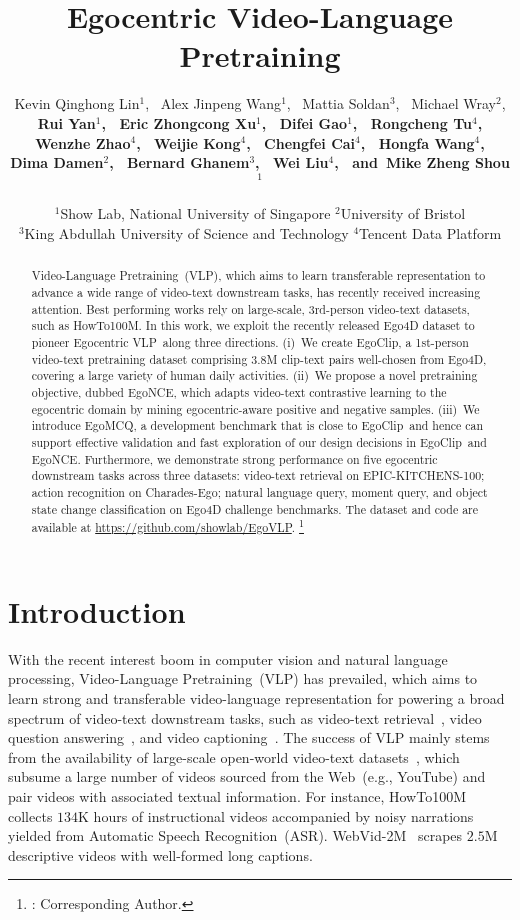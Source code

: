 \documentclass{article}
\title{Egocentric Video-Language Pretraining}
\author{Kevin Qinghong Lin$^1$,~
	Alex Jinpeng Wang$^1$,~
	Mattia Soldan$^3$,~
	Michael Wray$^2$,\\
\textbf{
	Rui Yan$^1$,~
	Eric Zhongcong Xu$^1$,~
	Difei Gao$^1$,~
	Rongcheng Tu$^4$,}\\
\textbf{
	Wenzhe Zhao$^4$,~
	Weijie Kong$^4$,~
	Chengfei Cai$^4$,~
	Hongfa Wang$^4$,}\\
\textbf{
    Dima Damen$^2$,~
	Bernard Ghanem$^3$,~
	Wei Liu$^4$,~
	and~Mike Zheng Shou$^1$\textsuperscript{\Letter}}
	\\\\
	$^1$Show Lab, National University of Singapore\quad
	$^2$University of Bristol\\
	$^3$King Abdullah University of Science and Technology\quad 
	$^4$Tencent Data Platform
}
\newcommand{\vlp}{Egocentric VLP}
\newcommand{\dataset}{EgoClip}
\newcommand{\model}{EgoNCE\xspace}
\newcommand{\eval}{EgoMCQ}
\newcommand{\epic}{EPIC-KITCHENS-100}
\newcommand{\web}{WebVid-2M}
\newcommand{\howto}{HowTo100M}
\begin{document}
\maketitle
\newcommand\blfootnote[1]{\begingroup
  \renewcommand\thefootnote{}\footnote{#1}\addtocounter{footnote}{-1}\endgroup
}

\begin{abstract}
Video-Language Pretraining~(VLP), which aims to learn transferable representation to advance a wide range of video-text downstream tasks, has recently received increasing attention. 
Best performing works rely on large-scale, 3rd-person video-text datasets, such as HowTo100M.
In this work, we exploit the recently released Ego4D dataset to pioneer \vlp~along three directions.
(i)~We create \dataset, a 1st-person video-text pretraining dataset comprising 3.8M clip-text pairs well-chosen from Ego4D, covering a large variety of human daily activities.
(ii)~We propose a novel pretraining objective, dubbed \model, which adapts video-text contrastive learning to the egocentric domain by mining egocentric-aware positive and negative samples.
(iii)~We introduce \eval, a development benchmark that is close to \dataset~and hence can support effective validation and fast exploration of our design decisions in \dataset~and \model.
Furthermore, we demonstrate strong performance on five egocentric downstream tasks across three datasets: video-text retrieval on \epic; action recognition on Charades-Ego; natural language query, moment query, and object state change classification on Ego4D challenge benchmarks.
The dataset and code are available at \textcolor{Fuchsia}{\url{https://github.com/showlab/EgoVLP}}.\blfootnote{\Letter: Corresponding Author.}
\end{abstract}

\section{Introduction}
With the recent interest boom in computer vision and natural language processing, Video-Language Pretraining~(VLP) has prevailed, which aims to learn strong and transferable video-language representation for powering a broad spectrum of video-text downstream tasks, such as video-text retrieval~\cite{xu2016msr, patrick2020support, bain2021frozen}, video question answering~\cite{msrvttqamsvdqa,yu2018joint,zhu2020actbert}, and video captioning~\cite{krishna2017dense, wang2018reconstruction, zhou2018end}.
The success of VLP mainly stems from the availability of large-scale open-world video-text datasets~\cite{miech2019howto100m}, which subsume a large number of videos sourced from the Web~(e.g., YouTube) and pair videos with associated textual information.
For instance, \howto~\cite{miech2019howto100m} collects $134$K hours of instructional videos accompanied by noisy narrations yielded from Automatic Speech Recognition~(ASR).
\web~\cite{bain2021frozen} scrapes $2.5$M descriptive videos with well-formed long captions.
\end{document}
